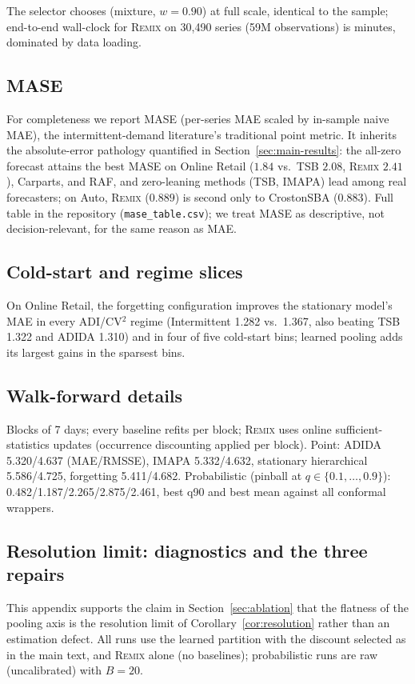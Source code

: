 \documentclass[twocolumn,10pt]{article}
\newcommand{\REMIX}{\textsc{Remix}}
\begin{document}
\noindent The selector chooses (mixture, $w{=}0.90$) at full scale,
identical to the sample; end-to-end wall-clock for \REMIX{} on 30{,}490
series (59M observations) is minutes, dominated by data loading.

\subsection{MASE}
For completeness we report MASE (per-series MAE scaled by in-sample
naive MAE), the intermittent-demand literature's traditional point
metric. It inherits the absolute-error pathology quantified in
Section~\ref{sec:main-results}: the all-zero forecast attains the best
MASE on Online Retail ($1.84$ vs.\ TSB $2.08$, \REMIX{} $2.41$),
Carparts, and RAF, and zero-leaning methods (TSB, IMAPA) lead among real
forecasters; on Auto, \REMIX{} ($0.889$) is second only to CrostonSBA
($0.883$). Full table in the repository
(\texttt{mase\_table.csv}); we treat MASE as descriptive, not
decision-relevant, for the same reason as MAE.

\subsection{Cold-start and regime slices}
On Online Retail, the forgetting configuration improves the stationary
model's MAE in every ADI/CV$^2$ regime (Intermittent 1.282 vs.\ 1.367,
also beating TSB 1.322 and ADIDA 1.310) and in four of five cold-start
bins; learned pooling adds its largest gains in the sparsest bins.

\subsection{Walk-forward details}
Blocks of 7 days; every baseline refits per block; \REMIX{} uses online
sufficient-statistics updates (occurrence discounting applied per block).
Point: ADIDA 5.320/4.637 (MAE/RMSSE), IMAPA 5.332/4.632, stationary
hierarchical 5.586/4.725, forgetting 5.411/4.682. Probabilistic
(pinball at $q\in\{0.1,\dots,0.9\}$): 0.482/1.187/2.265/2.875/2.461,
best q90 and best mean against all conformal wrappers.

\subsection{Resolution limit: diagnostics and the three repairs}
\label{app:resolution}

This appendix supports the claim in Section~\ref{sec:ablation} that the
flatness of the pooling axis is the resolution limit of
Corollary~\ref{cor:resolution} rather than an estimation defect. All
runs use the learned partition with the discount selected as in the main
text, and \REMIX{} alone (no baselines); probabilistic runs are raw
(uncalibrated) with $B=20$.
\end{document}
